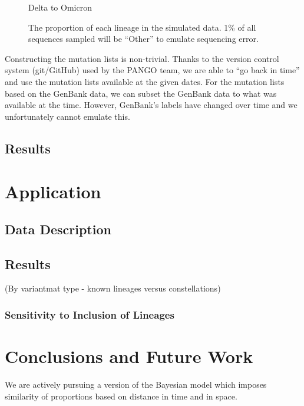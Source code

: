 \documentclass{article}
\begin{document}
\begin{figure}
Delta to Omicron
\caption{\label{deltacron}The proportion of each lineage in the simulated data. 1\% of all sequences sampled will be ``Other'' to emulate sequencing error.}
\end{figure}

Constructing the mutation lists is non-trivial.
Thanks to the version control system (git/GitHub) used by the PANGO team, we are able to ``go back in time'' and use the mutation lists available at the given dates.
For the mutation lists based on the GenBank data, we can subset the GenBank data to what was available at the time.
However, GenBank's labels have changed over time and we unfortunately cannot emulate this.


\subsection{Results}



\section{Application}

\subsection{Data Description}

\subsection{Results}

(By variantmat type - known lineages versus constellations)

\subsubsection{Sensitivity to Inclusion of Lineages}

\section{Conclusions and Future Work}


We are actively pursuing a version of the Bayesian model which imposes similarity of proportions based on distance in time and in space.
\end{document}
